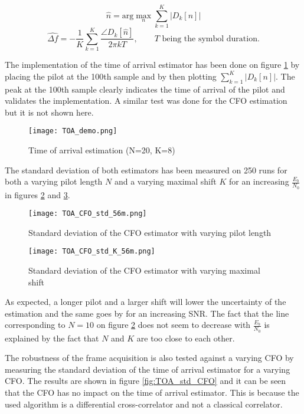 \begin{equation*}
    \hat{n} = \text{arg} \max_n \sum_{k=1}^{K} |D_k[n]|
\end{equation*}
\begin{equation*}
    \hat{\Delta f} = -\frac{1}{K} \sum_{k=1}^{K} \frac{\angle D_k[\hat{n}]}{2\pi kT}, \qquad T \text{ being the symbol duration.}
\end{equation*}

The implementation of the time of arrival estimator has been done on figure \ref{fig:TOA_demo} by placing the pilot at the 100th sample and by then plotting $\sum_{k=1}^{K} |D_k[n]|$. The peak at the 100th sample clearly indicates the time of arrival of the pilot and validates the implementation. A similar test was done for the CFO estimation but it is not shown here. \par

\begin{figure}[H]
    \centering
    \texttt{[image: TOA\_demo.png]}
    \caption{Time of arrival estimation (N=20, K=8)}
    \label{fig:TOA_demo}
\end{figure}

The standard deviation of both estimators has been measured on 250 runs for both a varying pilot length $N$ and a varying maximal shift $K$ for an increasing $\frac{E_b}{N_0}$ in figures \ref{fig:TOA_CFO_std_N} and \ref{fig:TOA_CFO_std_K}. 

\begin{figure}[H]
    \centering
    \texttt{[image: TOA\_CFO\_std\_56m.png]}
    \caption{Standard deviation of the CFO estimator with varying pilot length}
    \label{fig:TOA_CFO_std_N}
\end{figure}

\begin{figure}[H]
    \centering
    \texttt{[image: TOA\_CFO\_std\_K\_56m.png]}
    \caption{Standard deviation of the CFO estimator with varying maximal shift}
    \label{fig:TOA_CFO_std_K}
\end{figure}

As expected, a longer pilot and a larger shift will lower the uncertainty of the estimation and the same goes by for an increasing SNR. The fact that the line corresponding to $N = 10$ on figure \ref{fig:TOA_CFO_std_N} does not seem to decrease with $\frac{E_b}{N_0}$ is explained by the fact that $N$ and $K$ are too close to each other.\par
The robustness of the frame acquisition is also tested against a varying CFO by measuring the standard deviation of the time of arrival estimator for a varying CFO. The results are shown in figure \ref{fig:TOA_std_CFO} and it can be seen that the CFO has no impact on the time of arrival estimator. This is because the used algorithm is a differential cross-correlator and not a classical correlator. \par

